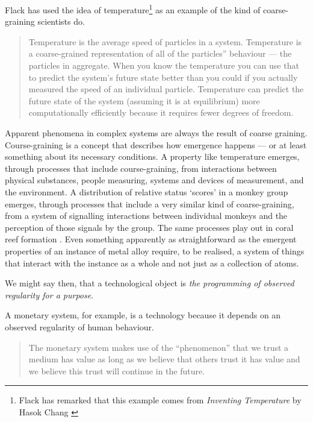 \documentclass[letterpaper]{article}
\begin{document}
    Flack has used the idea of temperature\footnote{

        Flack has remarked that this example comes from \emph{Inventing Temperature} by Hasok Chang \citep{ChangInvntngTmprtr2004}

    } as an example of the kind of coarse-graining scientists do.

    \begin{quote}
        Temperature is the average speed of particles in a system. Temperature is a coarse-grained representation of all of the particles” behaviour — the particles in aggregate. When you know the temperature you can use that to predict the system's future state better than you could if you actually measured the speed of an individual particle. Temperature can predict the future state of the system (assuming it is at equilibrium) more computationally efficiently because it requires fewer degrees of freedom. \citep[p.4]{FlackCrsGrnng2017}
    \end{quote}

    Apparent phenomena in complex systems are always the result of coarse graining. Course-graining is a concept that describes how emergence happens — or at least something about its necessary conditions. A property like temperature emerges, through processes that include course-graining, from interactions between physical substances, people measuring, systems and devices of measurement, and the environment. A distribution of relative status ‘scores’ in a monkey group emerges, through processes that include a very similar kind of coarse-graining, from a system of signalling interactions between individual monkeys and the perception of those signals by the group. The same processes play out in coral reef formation \citep{FlackEtAlTmsclsSymmtryUncrtnty2013}. Even something apparently as straightforward as the emergent properties of an instance of metal alloy require, to be realised, a system of things that interact with the instance as a whole and not just as a collection of atoms.

    We might say then, that a technological object is \emph{the programming of observed regularity for a purpose}.

    A monetary system, for example, is a technology because it depends on an observed regularity of human behaviour.

    \begin{quote}
        The monetary system makes use of the “phenomenon” that we trust a medium has value as long as we believe that others trust it has value and we believe this trust will continue in the future. \citep[p.55]{theNatureOfTechnology2009}
    \end{quote}
\end{document}
